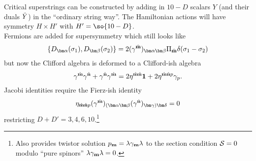 \documentclass[12pt]{article} %
\numberwithin{equation}{section}
\def\S{{\cal S}}
\begin{document}
{Critical superstrings can be constructed by adding in $10-D$ scalars $Y$ (and their duals $\Tilde Y$) in the ``ordinary string way''. The Hamiltonian actions will have symmetry $H \times H'$ with $H'=\so{10-D}$. \\
Fermions are added for supersymmetry which still looks like 
\begin{align*}
\{ D_{\bm \alpha}(\sigma_1) , D_{\bm \beta}(\sigma_2) \} = 2 (\gamma^{\hat {\bf m}})_{\bm \alpha \bm \beta} \Pi_{\hat {\bf m}} \delta(\sigma_1-\sigma_2)
\end{align*}
but now the Clifford algebra is deformed to a Clifford-ish algebra
\begin{align*}
\gamma^{\hat {\bf m}}\gamma^{\hat {\bf n}} + \gamma^{\hat {\bf n}}\gamma^{\hat {\bf m}}
= 2 \eta^{\hat {\bf m} \hat{\bf n}} {\bf 1} + 2 \eta^{\hat {\bf m} \hat{\bf n} p} \gamma_p.
\end{align*}
Jacobi identities require the Fierz-ish identity
\begin{align*}
\eta_{\hat {\bf m} \hat{\bf n} p } (\gamma^{\hat {\bf m}})_{(\bm \alpha \bm \beta} (\gamma^{\hat {\bf n}})_{\bm \gamma) \bm \delta} = 0
\end{align*}
restricting $D+D' = 3, 4, 6, 10$.\footnote{Also provides twistor solution $p_{\bf m} = \lambda \gamma_{\bf m} \lambda$ to the section condition $\S=0$ modulo ``pure spinors'' $\lambda \gamma_{\bf m} \lambda = 0$.
} %




}
\end{document}
